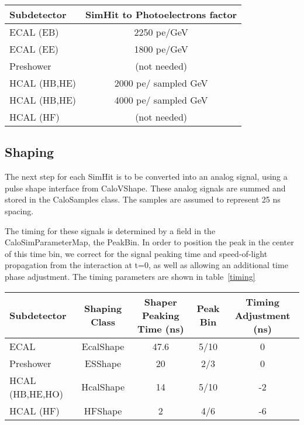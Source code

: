 \documentclass{cmspaper}
\begin{document}
\begin{center}
      \begin{tabular}{|l|c|} \hline
       \label{photostat}
         Subdetector & SimHit to Photoelectrons factor  \\ \hline
         ECAL (EB) & 2250  pe/GeV \\
         ECAL (EE) & 1800 pe/GeV \\
         Preshower & (not needed) \\
         HCAL (HB,HE) & 2000 pe/ sampled GeV  \\
         HCAL (HB,HE) & 4000 pe/ sampled GeV  \\
         HCAL (HF) & (not needed)  \\ \hline
      \end{tabular}
\end{center}


\subsection{Shaping}

The next step for each SimHit is to be converted into an analog signal,
using a pulse shape interface from CaloVShape.  These analog signals
are summed and stored in the CaloSamples class.  The samples are assumed
to represent 25 ns spacing.

The timing for these signals is determined by a field in the CaloSimParameterMap,
the PeakBin.  In order to position the peak in the center of this time bin, we correct for the signal peaking
time and speed-of-light
propagation from the interaction at t=0, as well as allowing an additional time phase
adjustment.  The timing parameters are shown in table~\ref{timing}

\begin{center}
      \begin{tabular}{|l|c|c|c|c|} \hline
       \label{timing}
         Subdetector & Shaping Class & Shaper Peaking Time (ns) & Peak Bin & Timing Adjustment (ns) \\ \hline
         ECAL & EcalShape & 47.6 & 5/10 & 0 \\ 
         Preshower & ESShape & 20  & 2/3 & 0 \\ 
         HCAL (HB,HE,HO) & HcalShape & 14  & 5/10 & -2 \\
         HCAL (HF) & HFShape & 2 & 4/6 & -6 \\ \hline
      \end{tabular}
\end{center}
\end{document}
